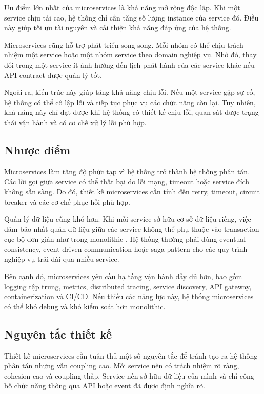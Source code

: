 \documentclass[../main.tex]{subfiles}
\begin{document}
Ưu điểm lớn nhất của microservices là khả năng mở rộng độc lập. Khi một service chịu tải cao, hệ thống chỉ cần tăng số lượng instance của service đó. Điều này giúp tối ưu tài nguyên và cải thiện khả năng đáp ứng của hệ thống.

Microservices cũng hỗ trợ phát triển song song. Mỗi nhóm có thể chịu trách nhiệm một service hoặc một nhóm service theo domain nghiệp vụ. Nhờ đó, thay đổi trong một service ít ảnh hưởng đến lịch phát hành của các service khác nếu API contract được quản lý tốt.

Ngoài ra, kiến trúc này giúp tăng khả năng chịu lỗi. Nếu một service gặp sự cố, hệ thống có thể cô lập lỗi và tiếp tục phục vụ các chức năng còn lại. Tuy nhiên, khả năng này chỉ đạt được khi hệ thống có thiết kế chịu lỗi, quan sát được trạng thái vận hành và có cơ chế xử lý lỗi phù hợp.

\subsection{Nhược điểm}

Microservices làm tăng độ phức tạp vì hệ thống trở thành hệ thống phân tán. Các lời gọi giữa service có thể thất bại do lỗi mạng, timeout hoặc service đích không sẵn sàng. Do đó, thiết kế microservices cần tính đến retry, timeout, circuit breaker và các cơ chế phục hồi phù hợp.

Quản lý dữ liệu cũng khó hơn. Khi mỗi service sở hữu cơ sở dữ liệu riêng, việc đảm bảo nhất quán dữ liệu giữa các service không thể phụ thuộc vào transaction cục bộ đơn giản như trong monolithic \cite{kleppmann2017designing,richardson2018microservices}. Hệ thống thường phải dùng eventual consistency, event-driven communication hoặc saga pattern cho các quy trình nghiệp vụ trải dài qua nhiều service.

Bên cạnh đó, microservices yêu cầu hạ tầng vận hành đầy đủ hơn, bao gồm logging tập trung, metrics, distributed tracing, service discovery, API gateway, containerization và CI/CD. Nếu thiếu các năng lực này, hệ thống microservices có thể khó debug và khó kiểm soát hơn monolithic.

\subsection{Nguyên tắc thiết kế}

Thiết kế microservices cần tuân thủ một số nguyên tắc để tránh tạo ra hệ thống phân tán nhưng vẫn coupling cao. Mỗi service nên có trách nhiệm rõ ràng, cohesion cao và coupling thấp. Service nên sở hữu dữ liệu của mình và chỉ công bố chức năng thông qua API hoặc event đã được định nghĩa rõ.
\end{document}
